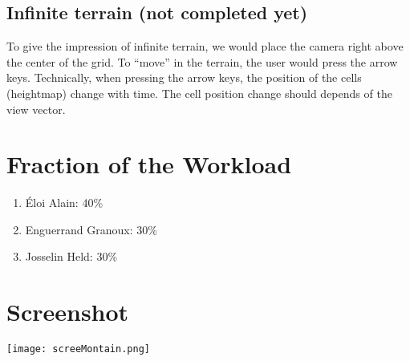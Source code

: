 \documentclass[12pt]{article}
\begin{document}
\subsection{Infinite terrain (not completed yet)}

To give the impression of infinite terrain, we would place the camera right above the center of the grid. To ``move'' in the terrain, the user would press the arrow keys. Technically, when pressing the arrow keys, the position of the cells (heightmap) change with time. The cell position change should depends of the view vector.

\section{Fraction of the Workload}


\begin{enumerate}
\item Éloi Alain: 40\%
\item Enguerrand Granoux: 30\%
\item Josselin Held: 30\%
\end{enumerate}

\section{Screenshot}

\begin{center}
\texttt{[image: screeMontain.png]}
\end{center}
\end{document}
